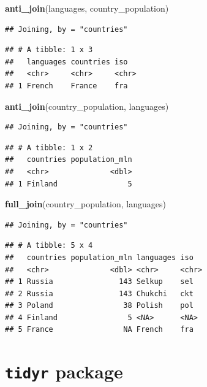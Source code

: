 \documentclass[]{book}
\newenvironment{Shaded}{\begin{snugshade}}{\end{snugshade}}
\newcommand{\KeywordTok}[1]{\textcolor[rgb]{0.13,0.29,0.53}{\textbf{#1}}}
\newcommand{\NormalTok}[1]{#1}
\begin{document}
\begin{Shaded}
\begin{Highlighting}[]
\KeywordTok{anti_join}\NormalTok{(languages, country_population)}
\end{Highlighting}
\end{Shaded}

\begin{verbatim}
## Joining, by = "countries"
\end{verbatim}

\begin{verbatim}
## # A tibble: 1 x 3
##   languages countries iso  
##   <chr>     <chr>     <chr>
## 1 French    France    fra
\end{verbatim}

\begin{Shaded}
\begin{Highlighting}[]
\KeywordTok{anti_join}\NormalTok{(country_population, languages)}
\end{Highlighting}
\end{Shaded}

\begin{verbatim}
## Joining, by = "countries"
\end{verbatim}

\begin{verbatim}
## # A tibble: 1 x 2
##   countries population_mln
##   <chr>              <dbl>
## 1 Finland                5
\end{verbatim}

\begin{Shaded}
\begin{Highlighting}[]
\KeywordTok{full_join}\NormalTok{(country_population, languages)}
\end{Highlighting}
\end{Shaded}

\begin{verbatim}
## Joining, by = "countries"
\end{verbatim}

\begin{verbatim}
## # A tibble: 5 x 4
##   countries population_mln languages iso  
##   <chr>              <dbl> <chr>     <chr>
## 1 Russia               143 Selkup    sel  
## 2 Russia               143 Chukchi   ckt  
## 3 Poland                38 Polish    pol  
## 4 Finland                5 <NA>      <NA> 
## 5 France                NA French    fra
\end{verbatim}

\hypertarget{tidyr-package}{%
\section{\texorpdfstring{\texttt{tidyr} package}{tidyr package}}\label{tidyr-package}}
\end{document}
